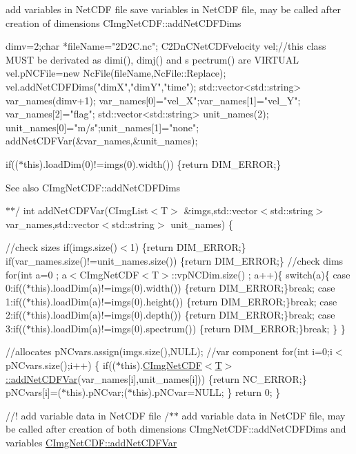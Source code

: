 add variables in NetCDF file save variables in NetCDF file, may be called after creation of dimensions {\ttfamily CImgNetCDF::addNetCDFDims} 


\begin{DoxyCode}
   dimv=2;char *fileName="2D2C.nc";
   C2DnCNetCDFvelocity vel;//this class MUST be derivated as dimi(), dimj() and s
      pectrum() are VIRTUAL
   vel.pNCFile=new NcFile(fileName,NcFile::Replace);
   vel.addNetCDFDims("dimX","dimY","time");
   std::vector<std::string> var_names(dimv+1);
   var_names[0]="vel_X";var_names[1]="vel_Y";
   var_names[2]="flag";
   std::vector<std::string> unit_names(2);
   unit_names[0]="m/s";unit_names[1]="none";
   addNetCDFVar(&var_names,&unit_names);
\end{DoxyCode}
if(($\ast$this).loadDim(0)!=imgs(0).width()) \{return DIM\_\-ERROR;\}

\begin{DoxySeeAlso}{See also}
CImgNetCDF::addNetCDFDims
\end{DoxySeeAlso}
$\ast$$\ast$/ int addNetCDFVar(CImgList$<$T$>$ \&imgs,std::vector$<$std::string$>$ var\_\-names,std::vector$<$std::string$>$ unit\_\-names) \{

//check sizes if(imgs.size()$<$1) \{return DIM\_\-ERROR;\} if(var\_\-names.size()!=unit\_\-names.size()) \{return DIM\_\-ERROR;\} //check dims for(int a=0 ; a$<$CImgNetCDF$<$T$>$::vpNCDim.size() ; a++)\{ switch(a)\{ case 0:if(($\ast$this).loadDim(a)!=imgs(0).width()) \{return DIM\_\-ERROR;\}break; case 1:if(($\ast$this).loadDim(a)!=imgs(0).height()) \{return DIM\_\-ERROR;\}break; case 2:if(($\ast$this).loadDim(a)!=imgs(0).depth()) \{return DIM\_\-ERROR;\}break; case 3:if(($\ast$this).loadDim(a)!=imgs(0).spectrum()) \{return DIM\_\-ERROR;\}break; \} \}

//allocates pNCvars.assign(imgs.size(),NULL); //var component for(int i=0;i$<$pNCvars.size();i++) \{ if(($\ast$this).\hyperlink{classCImgNetCDF_abae347b1449a8e6f65188ace2df5fee6}{CImgNetCDF$<$T$>$::addNetCDFVar}(var\_\-names\mbox{[}i\mbox{]},unit\_\-names\mbox{[}i\mbox{]})) \{return NC\_\-ERROR;\} pNCvars\mbox{[}i\mbox{]}=($\ast$this).pNCvar;($\ast$this).pNCvar=NULL; \} return 0; \}

//! add variable data in NetCDF file /$\ast$$\ast$ add variable data in NetCDF file, may be called after creation of both dimensions {\ttfamily CImgNetCDF::addNetCDFDims} and variables {\ttfamily \hyperlink{classCImgNetCDF_abae347b1449a8e6f65188ace2df5fee6}{CImgNetCDF::addNetCDFVar}} 


\begin{DoxyCode}
\end{DoxyCode}


